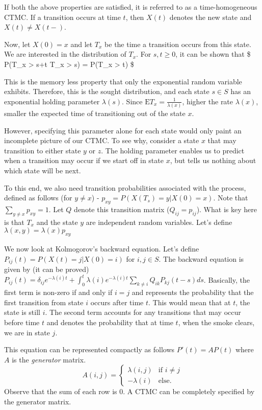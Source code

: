 \documentclass[
  nojss]{jss}
\begin{document}
If both the above properties are satisfied, it is referred to as a time-homogeneous CTMC. If a transition occurs at time \(t\), then \(X(t)\) denotes the new state and \(X(t)\neq X(t-)\).

Now, let \(X(0)=x\) and let \(T_x\) be the time a transition occurs from this state. We are interested in the distribution of \(T_x\). For \(s,t \geq 0\), it can be shown that \$ P(T\_x \textgreater{} s+t \textbar{} T\_x \textgreater{} s) = P(T\_x \textgreater{} t) \$

This is the memory less property that only the exponential random variable exhibits. Therefore, this is the sought distribution, and each state \(s \in S\) has an exponential holding parameter \(\lambda(s)\). Since \(\mathrm{E}T_x = \frac{1}{\lambda(x)}\), higher the rate \(\lambda(x)\), smaller the expected time of transitioning out of the state \(x\).

However, specifying this parameter alone for each state would only paint an incomplete picture of our CTMC. To see why, consider a state \(x\) that may transition to either state \(y\) or \(z\). The holding parameter enables us to predict when a transition may occur if we start off in state \(x\), but tells us nothing about which state will be next.

To this end, we also need transition probabilities associated with the process, defined as follows (for \(y \neq x\)) - \(p_{xy} = P(X(T_s) = y | X(0) = x)\). Note that \(\sum_{y \neq x} p_{xy} = 1\). Let \(Q\) denote this transition matrix (\(Q_{ij} = p_{ij}\)). What is key here is that \(T_x\) and the state \(y\) are independent random variables. Let's define \(\lambda(x, y) = \lambda(x) p_{xy}\)

We now look at Kolmogorov's backward equation. Let's define \(P_{ij}(t) = P(X(t) = j | X(0) = i)\) for \(i, j \in S\). The backward equation is given by (it can be proved) \(P_{ij}(t) = \delta_{ij}e^{-\lambda(i)t} + \int_{0}^{t}\lambda(i)e^{-\lambda(i)t} \sum_{k \neq i} Q_{ik} P_{kj}(t-s) ds\). Basically, the first term is non-zero if and only if \(i=j\) and represents the probability that the first transition from state \(i\) occurs after time \(t\). This would mean that at \(t\), the state is still \(i\). The second term accounts for any transitions that may occur before time \(t\) and denotes the probability that at time \(t\), when the smoke clears, we are in state \(j\).

This equation can be represented compactly as follows \(P'(t) = AP(t)\) where \(A\) is the \emph{generator} matrix.
\[
A(i, j) = \begin{cases} \lambda(i, j) & \mbox{if } i \neq j \\ -\lambda(i) & \mbox{else.} \end{cases}
\]
Observe that the sum of each row is 0. A CTMC can be completely specified by the generator matrix.
\end{document}
